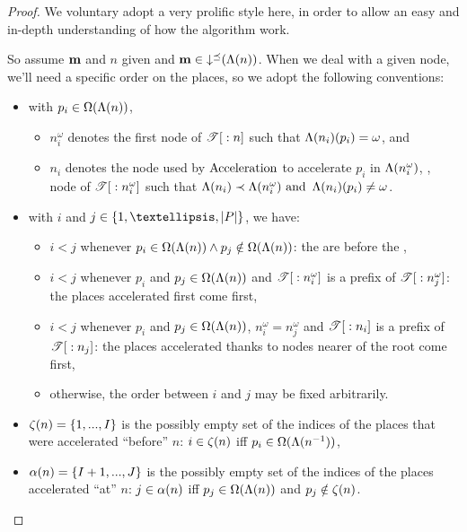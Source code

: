 \begin{proof}
  We voluntary adopt a very prolific style here, in order to allow an easy and in-depth understanding of how the algorithm work.

  So assume $\mathbf{m}$ and $n$ given and $\mathbf{m} \in \operatorname{\downarrow^\preceq}(\operatorname{\Lambda}(n))$.
  When we deal with a given node, we'll need a specific order on the places, so we adopt the following conventions:
  \begin{itemize}
    \item with $p_i \in \operatorname{\Omega}(\operatorname{\Lambda}(n))$,
      \begin{itemize}
        \item $n^\omega_i$ denotes the first node of ${\mathscr{T}}[{}:{n}]$ such that $\operatorname{\Lambda}(n_i)(p_i) = \omega$, and
        \item $n_i$ denotes the node used by $\operatorname{Acceleration}$ to accelerate $p_i$ in $\operatorname{\Lambda}(n^\omega_i)$, \ie,  node of ${\mathscr{T}}[{}:{n^\omega_i}]$ such that $\operatorname{\Lambda}(n_i) \prec \operatorname{\Lambda}(n^\omega_i) \text{ and } \operatorname{\Lambda}(n_i)(p_i) \neq \omega$.
      \end{itemize}
    \item with $i$ and $j \in \{1, …, \card{\places}\}$, we have:
      \begin{itemize}
        \item $i < j$ whenever $p_i \in \operatorname{\Omega}(\operatorname{\Lambda}(n)) \wedge p_j \notin \operatorname{\Omega}(\operatorname{\Lambda}(n))$:
          the \oplaces are before the \noplaces,
        \item $i < j$ whenever $p_i$ and $p_j \in \operatorname{\Omega}(\operatorname{\Lambda}(n))$ and ${\mathscr{T}}[{}:{n^\omega_i}]$ is a prefix of ${\mathscr{T}}[{}:{n^\omega_j}]$:
          the places accelerated first come first,
        \item $i < j$ whenever $p_i$ and $p_j \in \operatorname{\Omega}(\operatorname{\Lambda}(n))$, $n^\omega_i = n^\omega_j$ and ${\mathscr{T}}[{}:{n_i}]$ is a prefix of ${\mathscr{T}}[{}:{n_j}]$:
          the places accelerated thanks to nodes nearer of the root come first,
        \item otherwise, the order between $i$ and $j$ may be fixed arbitrarily.
      \end{itemize}
    \item $\operatorname{\zeta}(n) = \{1, ..., I\}$ is the possibly empty set of the indices of the places that were accelerated ``before'' $n$: $i \in \operatorname{\zeta}(n)$ iff $p_i \in \operatorname{\Omega}(\operatorname{\Lambda}(n^{-1}))$,
    \item $\operatorname{\alpha}(n) = \{I+1, ..., J\}$ is the possibly empty set of the indices of the places accelerated ``at'' $n$: $j \in \operatorname{\alpha}(n)$ iff $p_j \in \operatorname{\Omega}(\operatorname{\Lambda}(n))$ and $p_j \notin \operatorname{\zeta}(n)$.%
  \end{itemize}


\end{proof}
